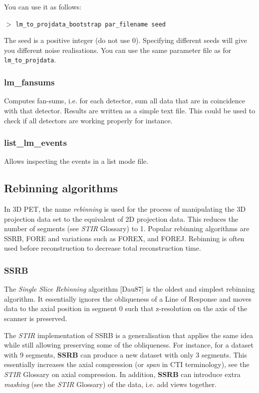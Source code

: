 \documentclass{article}
\newcommand{\cmdline}[1]{\par \noindent $>$ \texttt{#1}\par}
\begin{document}
You can use it as follows:

\cmdline{lm\_to\_projdata\_bootstrap par\_filename seed}

The seed is a positive integer (do not use $0$). Specifying different seeds will give you different noise realisations.
You can use the same parameter file as for \texttt{lm\_to\_projdata}.

\subsubsection{
lm\_fansums}
Computes fan-sums, i.e. for each detector, sum all data that are in coincidence with that detector.
Results are written as a simple text file. This could be used to check if all detectors are working
properly for instance.

\subsubsection{
list\_lm\_events}
Allows inspecting the events in a list mode file.

\subsection{
Rebinning algorithms}

In 3D PET, the name \textit{rebinning} is used for the 
process of manipulating the 3D projection data set to the equivalent 
of 2D projection data. This reduces the number of segments (see 
\textit{STIR} Glossary) to 1. Popular rebinning algorithms are SSRB, FORE 
and variations such as FOREX, and FOREJ. Rebinning is often used 
before reconstruction to decrease total reconstruction time.


\subsubsection{
SSRB}
\label{sec:SSRB}
The \textit{Single Slice Rebinning} algorithm [Dau87] is the oldest 
and simplest rebinning algorithm. It essentially ignores the 
obliqueness of a Line of Response and moves data to the axial 
position in segment 0 such that z-resolution on the axis of the 
scanner is preserved.


The \textit{STIR} implementation of SSRB is a generalisation that applies 
the same idea while still allowing preserving some of the obliqueness. 
For instance, for a dataset with 9 segments, \textbf{SSRB} can produce 
a new dataset with only 3 segments. This essentially increases 
the axial compression (or \textit{span} in CTI terminology), see the 
\textit{STIR} Glossary on axial compression. In addition, \textbf{SSRB} can 
introduce extra \textit{mashing} (see the \textit{STIR} Glossary) of the data, 
i.e. add views together.
\end{document}
